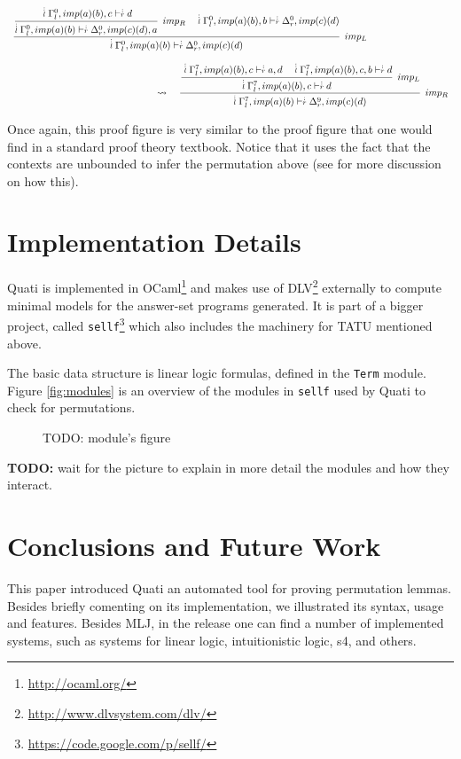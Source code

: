 \documentclass{llncs}
\newcommand{\ndots}[1]{\stackrel{\vcenter{\hbox{$\scriptstyle :$}\vskip-.35ex}}
   {\hbox {$ \scriptstyle {#1}$}}}
\begin{document}
{\scriptsize
\[
\begin{array}{ll}
\cfrac{\cfrac{ \ndots{l} \Gamma_{l}^{0}, imp (a) (b) , c \vdash  \ndots{r} d}
{ \ndots{l} \Gamma_{l}^{0}, imp (a) (b)  \vdash  \ndots{r} \Delta_{r}^{0}, imp (c) (d) , a} \;\; imp_{R}
\quad
 \ndots{l} \Gamma_{l}^{0}, imp (a) (b) , b \vdash  \ndots{r} \Delta_{r}^{0}, imp (c) (d) }
{ \ndots{l} \Gamma_{l}^{0}, imp (a) (b)  \vdash  \ndots{r} \Delta_{r}^{0}, imp (c) (d) } \;\; imp_{L}\\\\
\qquad \qquad \qquad \qquad \qquad \qquad \qquad \quad\rightsquigarrow\quad
\cfrac{\cfrac{ \ndots{l} \Gamma_{l}^{7}, imp (a) (b) , c \vdash  \ndots{r} a, d
\quad
 \ndots{l} \Gamma_{l}^{7}, imp (a) (b) , c, b \vdash  \ndots{r} d}
{ \ndots{l} \Gamma_{l}^{7}, imp (a) (b) , c \vdash  \ndots{r} d} \;\; imp_{L}}
{ \ndots{l} \Gamma_{l}^{7}, imp (a) (b)  \vdash  \ndots{r} \Delta_{r}^{9}, imp (c) (d) } \;\; imp_{R}
\end{array}
\]
}

Once again, this proof figure is very similar to the proof figure that one would find in a standard proof theory textbook.
Notice that it uses the fact that the contexts are unbounded to infer the permutation above (see \cite{nigam13iclp} for 
more discussion on how this).

\section{Implementation Details}
\label{sec:impl}

Quati is implemented in OCaml\footnote{\url{http://ocaml.org/}} and makes use of
DLV\footnote{\url{http://www.dlvsystem.com/dlv/}} externally to compute minimal models for the
answer-set programs generated. It is part of a bigger project, called
\texttt{sellf}\footnote{\url{https://code.google.com/p/sellf/}} which also includes the
machinery for TATU mentioned above. 

The basic data structure is linear logic formulas,
defined in the \texttt{Term} module. Figure \ref{fig:modules} is an overview
of the modules in \texttt{sellf} used by Quati to check for permutations.

\begin{figure}
TODO: module's figure
\end{figure}

\textbf{TODO:} wait for the picture to explain in more detail the modules and how they
interact.

\section{Conclusions and Future Work}
\label{sec:conc}
This paper introduced Quati an automated tool for proving permutation lemmas. Besides briefly 
comenting on its implementation, we illustrated its syntax, usage and features. Besides MLJ, in the release
one can find a number of implemented systems, such as systems for linear logic, intuitionistic logic, s4, 
and others. 
\end{document}
